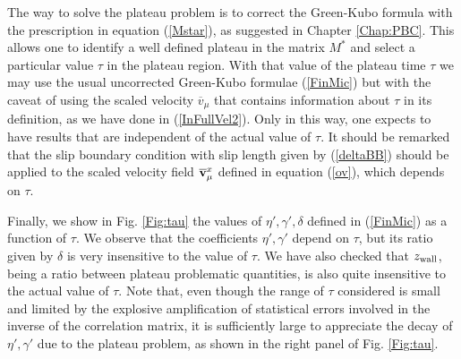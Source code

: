 \documentclass[b5paper,openright,10pt]{book}
\begin{document}
The way  to solve  the plateau  problem is  to correct  the Green-Kubo
formula with the  prescription in equation  (\ref{Mstar}),  as suggested in
Chapter \ref{Chap:PBC}.  This allows one to  identify a well defined plateau in
the matrix $M^*$  and select a particular value $\tau$  in the plateau
region. With  that value  of the  plateau time $\tau$  we may  use the
usual  uncorrected Green-Kubo  formulae  (\ref{FinMic})  but with  the
caveat of  using the scaled velocity  $\overline{v}_\mu$ that contains
information  about  $\tau$ in  its  definition,  as  we have  done  in
(\ref{InFullVel2}). Only in this way,  one expects to have results that
are independent of  the actual value of $\tau$. It  should be remarked
that  the   slip  boundary  condition   with  slip  length   given  by
(\ref{deltaBB})  should  be  applied  to  the  scaled  velocity  field
$\overline{\bf v}_\mu^x$ defined in equation (\ref{ov}), which depends on $\tau$.

Finally,   we   show   in    Fig.    \ref{Fig:tau}   the   values   of
$\eta',\gamma',\delta$  defined in  (\ref{FinMic})  as  a function  of
$\tau$.  We  observe that  the coefficients $\eta',\gamma'$  depend on
$\tau$, but  its ratio given  by $\delta$  is very insensitive  to the
value  of  $\tau$.   We  have  also checked  that  $z_{\rm  wall}$, being a ratio
between plateau problematic quantities,  is also quite
insensitive to the actual value of  $\tau$. Note that, even though the
range  of $\tau$  considered is  small  and limited  by the  explosive
amplification of  statistical errors  involved in  the inverse  of the
correlation matrix, it  is sufficiently large to  appreciate the decay
of $\eta',\gamma'$ due to the plateau problem, as shown in the right panel of Fig. \ref{Fig:tau}.
\end{document}
